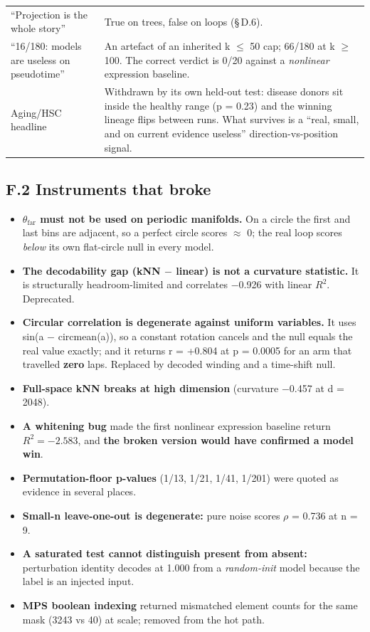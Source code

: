 \begin{longtable}[]{@{}
  >{\raggedright\arraybackslash}p{}
  >{\raggedright\arraybackslash}p{}@{}}
``Projection is the whole story'' & True on trees, false on loops (\S\,D.6). \\
``16/180: models are useless on pseudotime'' & An artefact of an inherited k \(\le\) 50 cap; 66/180 at k \(\ge\) 100. The correct verdict is 0/20 against a \emph{nonlinear} expression baseline. \\
Aging/HSC headline & Withdrawn by its own held-out test: disease donors sit inside the healthy range (p = 0.23) and the winning lineage flips between runs. What survives is a ``real, small, and on current evidence useless'' direction-vs-position signal. \\
\end{longtable}

\hypertarget{f.2-instruments-that-broke}{%
\subsection{F.2 Instruments that broke}\label{f.2-instruments-that-broke}}

\begin{itemize}
\tightlist
\item
  \textbf{\(\theta_{\mathrm{far}}\) must not be used on periodic manifolds.} On a circle the first and last bins are adjacent, so
  a perfect circle scores \(\approx\) 0; the real loop scores \emph{below} its own flat-circle null in every model.
\item
  \textbf{The decodability gap (kNN \(-\) linear) is not a curvature statistic.} It is structurally
  headroom-limited and correlates \(-\)0.926 with linear \(R^2\). Deprecated.
\item
  \textbf{Circular correlation is degenerate against uniform variables.} It uses sin(a \(-\) circmean(a)), so a
  constant rotation cancels and the null equals the real value exactly; and it returns r = +0.804 at
  p = 0.0005 for an arm that travelled \textbf{zero} laps. Replaced by decoded winding and a time-shift null.
\item
  \textbf{Full-space kNN breaks at high dimension} (curvature \(-\)0.457 at d = 2048).
\item
  \textbf{A whitening bug} made the first nonlinear expression baseline return \(R^2 = -2.583\), and \textbf{the broken
  version would have confirmed a model win}.
\item
  \textbf{Permutation-floor p-values} (1/13, 1/21, 1/41, 1/201) were quoted as evidence in several places.
\item
  \textbf{Small-n leave-one-out is degenerate:} pure noise scores \textbar{}\(\rho\)\textbar{} = 0.736 at n = 9.
\item
  \textbf{A saturated test cannot distinguish present from absent:} perturbation identity decodes at 1.000
  from a \emph{random-init} model because the label is an injected input.
\item
  \textbf{MPS boolean indexing} returned mismatched element counts for the same mask (3243 vs 40) at scale;
  removed from the hot path.
\end{itemize}

